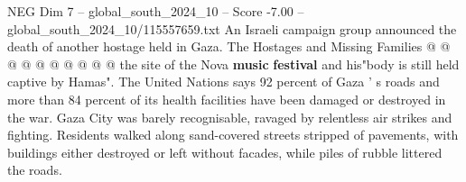 \begin{textsample}{NEG Dim 7 – global\_south\_2024\_10 – Score -7.00 – global\_south\_2024\_10/115557659.txt}
An Israeli campaign group announced the death of another hostage held in Gaza.
The Hostages and Missing Families @ @ @ @ @ @ @ @ @ @ the site of the Nova \textbf{music} \textbf{festival} and his"body is still held captive by Hamas".
The United Nations says 92 percent of Gaza ' s roads and more than 84 percent of its health facilities have been damaged or destroyed in the war.
Gaza City was barely recognisable, ravaged by relentless air strikes and fighting.
Residents walked along sand-covered streets stripped of pavements, with buildings either destroyed or left without facades, while piles of rubble littered the roads.

\end{textsample}
